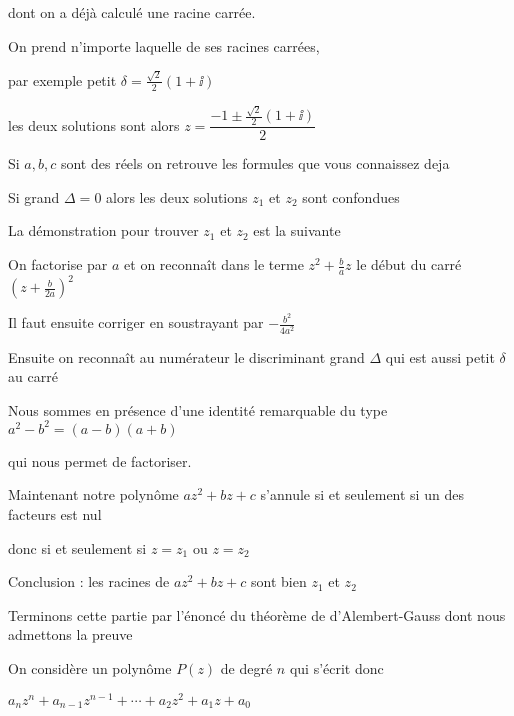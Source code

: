 \change

dont on a déjà calculé une racine carrée.

On prend n'importe laquelle de ses racines carrées,

par exemple petit $\delta = \frac{\sqrt2}{2}(1 +  \ii)$ 

\change

les deux solutions sont alors $z = \dfrac{- 1 \pm \frac{\sqrt2}{2}(1 +  \ii)}{2}$


\change

Si $a, b, c$ sont des réels on retrouve les formules que vous connaissez deja


\change

Si grand $\Delta=0$ alors les deux solutions $z_1$ et $z_2$ sont confondues


\diapo

\change

La démonstration pour trouver $z_1$ et $z_2$ est la suivante

On factorise par $a$ et on reconnaît dans le terme $z^2 + \frac ba z$ le début du carré
$(z+\frac {b}{2a})^2$

Il faut ensuite corriger en soustrayant par $-\frac{b^2}{4a^2}$

\change

Ensuite on reconnaît au numérateur le discriminant grand $ \Delta$
qui est aussi petit $\delta$ au carré

\change

Nous sommes en présence d'une identité remarquable du type 
$a^2-b^2 = (a-b)(a+b)$

qui nous permet de factoriser.

\change

Maintenant notre polynôme $az^2+bz+c$ s'annule 
si et seulement si un des facteurs est nul

donc si et seulement si $z=z_1$ ou $z=z_2$

Conclusion : les racines de $az^2+bz+c$ 
sont bien $z_1$ et $z_2$




\diapo

Terminons cette partie par l'énoncé du théorème de d'Alembert-Gauss
dont nous admettons la preuve

On considère un polynôme $P(z)$ de degré $n$
qui s'écrit donc

$a_n z^n+a_{n-1}z^{n-1}+\cdots + a_2 z^2 + a_1z+a_0$

